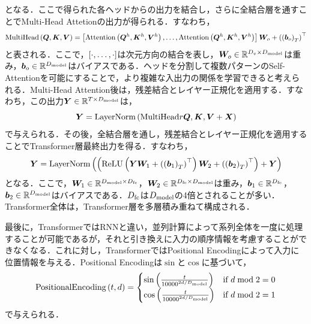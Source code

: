 \documentclass[12pt]{jarticle}
\numberwithin{equation}{section}    %
\numberwithin{figure}{section}      %
\numberwithin{table}{section}      %
\begin{document}
となる．ここで得られた各ヘッドからの出力を結合し，さらに全結合層を通すことでMulti-Head Attetionの出力が得られる．すなわち，
\begin{equation}
    \text{MultiHead}\left(\bm{Q}, \bm{K}, \bm{V}\right) = \left[\text{Attention}\left(\bm{Q}^{h}, \bm{K}^{h}, \bm{V}^{h}\right), \ldots, \text{Attention}\left(\bm{Q}^{h}, \bm{K}^{h}, \bm{V}^{h}\right)\right] \bm{W}_{o} + \left(\left(\bm{b}_{o}\right)_{T}\right)^\top
\end{equation}
と表される．ここで，$\left[\cdot, \ldots, \cdot\right]$は次元方向の結合を表し，$\bm{W}_{o} \in \mathbb{R}^{D_{v} \times D_{\text{model}}}$は重み，$\bm{b}_{o} \in \mathbb{R}^{D_{\text{model}}}$はバイアスである．ヘッドを分割して複数パターンのSelf-Attentionを可能にすることで，より複雑な入出力の関係を学習できると考えられる．Multi-Head Attention後は，残差結合とレイヤー正規化を適用する．すなわち，この出力$\bm{Y} \in \mathbb{R}^{T \times D_{\text{model}}}$は，
\begin{equation}
    \bm{Y} = \text{LayerNorm}\left(\text{MultiHead}r{\bm{Q}, \bm{K}, \bm{V}} + \bm{X}\right)
\end{equation}
で与えられる．その後，全結合層を通し，残差結合とレイヤー正規化を適用することでTransformer層最終出力を得る．すなわち，
\begin{equation}
    \bm{Y} = \text{LayerNorm}\left(\left(\text{ReLU}\left(\bm{Y}\bm{W}_{1} + \left(\left(\bm{b}_{1}\right)_{T}\right)^\top\right)\bm{W}_{2} + \left(\left(\bm{b}_{2}\right)_{T}\right)^\top\right) + \bm{Y}\right)
\end{equation}
となる．ここで，$\bm{W}_{1} \in \mathbb{R}^{D_{\text{model}} \times D_{\text{fc}}}$，$\bm{W}_{2} \in \mathbb{R}^{D_{\text{fc}} \times D_{\text{model}}}$は重み，$\bm{b}_{1} \in \mathbb{R}^{D_{\text{fc}}}$，$\bm{b}_{2} \in \mathbb{R}^{D_{\text{model}}}$はバイアスである．$D_{\text{fc}}$は$D_{\text{model}}$の4倍とされることが多い．Transformer全体は，Transformer層を多層積み重ねて構成される．

最後に，TransformerではRNNと違い，並列計算によって系列全体を一度に処理することが可能であるが，それと引き換えに入力の順序情報を考慮することができなくなる．これに対し，TransformerではPositional Encodingによって入力に位置情報を与える．Positional Encodingは$\sin$と$\cos$に基づいて，
\begin{equation}
    \text{PositionalEncoding}\left(t, d\right) =
    \begin{cases}
        \sin \left(\frac{t}{10000^{2d / D_{\text{model}}}}\right) & \text{if $d \bmod 2 = 0$} \\
        \cos \left(\frac{t}{10000^{2d / D_{\text{model}}}}\right) & \text{if $d \bmod 2 = 1$}
    \end{cases}
\end{equation}
で与えられる．
\end{document}
